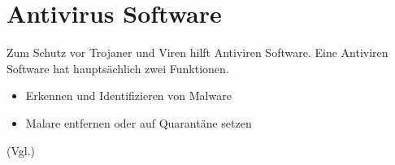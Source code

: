 \section{Antivirus Software}\label{sec:antivirus}
Zum Schutz vor Trojaner und Viren hilft Antiviren Software. Eine Antiviren Software hat hauptsächlich zwei Funktionen.
\begin{itemize}
\item Erkennen und Identifizieren von Malware
\item Malare entfernen oder auf Quarantäne setzen
\end{itemize}
(Vgl.\cite{ANTNET})